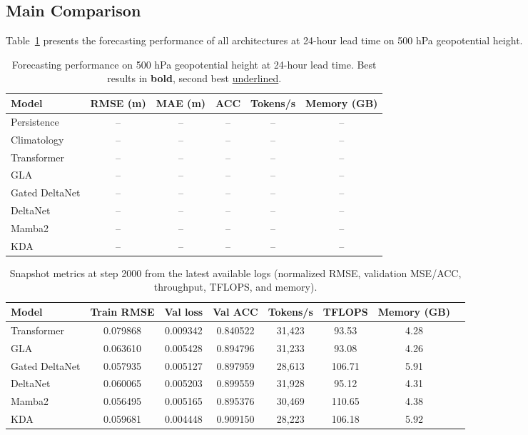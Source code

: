 \documentclass[runningheads]{llncs}
\begin{document}
\subsection{Main Comparison}

Table~\ref{tab:main_results} presents the forecasting performance of all architectures at 24-hour lead time on 500 hPa geopotential height.

\begin{table}[t]
    \centering
    \caption{Forecasting performance on 500 hPa geopotential height at 24-hour lead time. Best results in \textbf{bold}, second best \underline{underlined}.}
    \label{tab:main_results}
    \begin{tabular}{lccccc}
        \toprule
        \textbf{Model} & \textbf{RMSE (m)} & \textbf{MAE (m)} & \textbf{ACC} & \textbf{Tokens/s} & \textbf{Memory (GB)} \\
        \midrule
        Persistence & -- & -- & -- & -- & -- \\
        Climatology & -- & -- & -- & -- & -- \\
        \midrule
        Transformer & -- & -- & -- & -- & -- \\
        GLA & -- & -- & -- & -- & -- \\
        Gated DeltaNet & -- & -- & -- & -- & -- \\
        DeltaNet & -- & -- & -- & -- & -- \\
        Mamba2 & -- & -- & -- & -- & -- \\
        KDA & -- & -- & -- & -- & -- \\
        \bottomrule
    \end{tabular}
\end{table}

\begin{table}[t]
    \centering
    \caption{Snapshot metrics at step 2000 from the latest available logs (normalized RMSE, validation MSE/ACC, throughput, TFLOPS, and memory).}
    \label{tab:main_results_step2000}
    \begin{tabular}{lccccccc}
        \toprule
        \textbf{Model} & \textbf{Train RMSE} & \textbf{Val loss} & \textbf{Val ACC} & \textbf{Tokens/s} & \textbf{TFLOPS} & \textbf{Memory (GB)} \\
        \midrule
        Transformer & 0.079868 & 0.009342 & 0.840522 & 31,423 & 93.53 & 4.28 \\
        GLA & 0.063610 & 0.005428 & 0.894796 & 31,233 & 93.08 & 4.26 \\
        Gated DeltaNet & 0.057935 & 0.005127 & 0.897959 & 28,613 & 106.71 & 5.91 \\
        DeltaNet & 0.060065 & 0.005203 & 0.899559 & 31,928 & 95.12 & 4.31 \\
        Mamba2 & 0.056495 & 0.005165 & 0.895376 & 30,469 & 110.65 & 4.38 \\
        KDA & 0.059681 & 0.004448 & 0.909150 & 28,223 & 106.18 & 5.92 \\
        \bottomrule
    \end{tabular}
\end{table}
\end{document}
